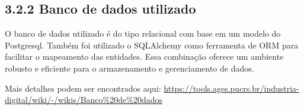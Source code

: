 \hypertarget{__RefHeading___Toc4775_3118176633}{}
\subsection*{3.2.2 Banco de dados utilizado}
\label{ages-ii:text-h-0043}

\indent O banco de dados utilizado é do tipo relacional com base em um modelo do Postgresql\space\cite{ages-iv-postgresql}. Também foi utilizado o SQLAlchemy\space\cite{ages-ii-sqlalchemy} como ferramenta de ORM para facilitar o mapeamento das entidades. Essa combinação oferece um ambiente robusto e eficiente para o armazenamento e gerenciamento de dados.\par

\indent Mais detalhes podem ser encontrados aqui: \url{https://tools.ages.pucrs.br/industria-digital/wiki/-/wikis/Banco%20de%20dados}\par

